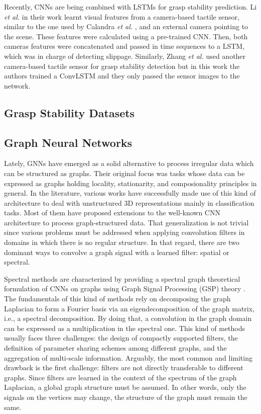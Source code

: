 Recently, \acp{CNN} are being combined with \acp{LSTM} for grasp stability prediction. Li \emph{et al.} \cite{Li2018} in their work learnt visual features from a camera-based tactile sensor, similar to the one used by Calandra \emph{et al.} \cite{Calandra2017}, and an external camera pointing to the scene. These features were calculated using a pre-trained \ac{CNN}. Then, both cameras features were concatenated and passed in time sequences to a \ac{LSTM}, which was in charge of detecting slippage. Similarly, Zhang \emph{et al.} \cite{Zhang2018} used another camera-based tactile sensor for grasp stability detection but in this work the authors trained a \ac{ConvLSTM} and they only passed the sensor images to the network.

\subsection{Grasp Stability Datasets}

\subsection{Graph Neural Networks}
\label{cha:tactile:sec:relatedworks:subsec:gcns}

Lately, \acp{GNN} have emerged as a solid alternative to process irregular data which can be structured as graphs. Their original focus was tasks whose data can be expressed as graphs holding locality, stationarity, and composionality principles in general. In the literature, various works have successfully made use of this kind of architecture to deal with unstructured \acs{3D} representations mainly in classification tasks. Most of them  have proposed extensions to the well-known \ac{CNN} architecture to process graph-structured data. That generalization is not trivial since various problems must be addressed when applying convolution filters in domains in which there is no regular structure. In that regard, there are two dominant ways to convolve a graph signal with a learned filter: spatial or spectral.

Spectral methods are characterized by providing a spectral graph theoretical formulation of CNNs on graphs using Graph Signal Processing (GSP) theory \cite{Shuman2013}. The fundamentals of this kind of methods rely on decomposing the graph Laplacian to form a Fourier basis via an eigendecomposition of the graph matrix, i.e., a spectral decomposition. By doing that, a convolution in the graph domain can be expressed as a multiplication in the spectral one. This kind of methods usually faces three challenges: the design of compactly supported filters, the definition of parameter sharing schemes among different graphs, and the aggregation of multi-scale information. Arguably, the most common and limiting drawback is the first challenge: filters are not directly transferable to different graphs. Since filters are learned in the context of the spectrum of the graph Laplacian, a global graph structure must be assumed. In other words, only the signals on the vertices may change, the structure of the graph must remain the same.

